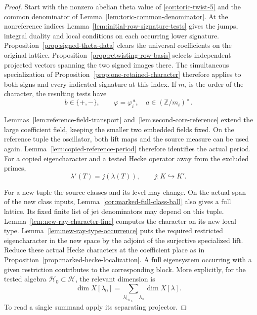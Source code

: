\begin{proof}
Start with the nonzero abelian theta value of \ref{cor:toric-twist-5} and the common denominator of Lemma~\ref{lem:toric-common-denominator}. At the nonreference indices Lemma~\ref{lem:initial-row-signature-tests} gives the jumps, integral duality and local conditions on each occurring lower signature. Proposition~\ref{prop:signed-theta-data} clears the universal coefficients on the original lattice. Proposition~\ref{prop:retwisting-row-basis} selects independent projected vectors spanning the two signed images there. The simultaneous specialization of Proposition~\ref{prop:one-retained-character} therefore applies to both signs and every indicated signature at this index. If \(m_i\) is the order of the character, the resulting tests have
\[
          b\in\{+,-\},\qquad \varphi=\varphi_i^{\,a},
                                     \quad a\in(\mathbb Z/m_i)^\times .
\]

 Lemmas~\ref{lem:reference-field-transport}
and~\ref{lem:second-core-reference} extend the large coefficient
field, keeping the smaller two embedded fields fixed. On the
reference tuple the oscillator, both lift maps and the source
measure can be used again. Lemma~\ref{lem:copied-reference-period}
therefore identifies the actual period. For a copied eigencharacter
and a tested Hecke operator away from the excluded primes,
\[
              \lambda'(T)=j(\lambda(T)),\qquad j:K\hookrightarrow K'.
\]

For a new tuple the source classes and its level may change.
On the actual span of the new class inputs, Lemma~\ref{cor:marked-full-class-ball} also gives a full lattice. Its fixed finite list of jet denominators may depend on this tuple. Lemma~\ref{lem:new-ray-character-line} computes the character on
its new local type. Lemma~\ref{lem:new-ray-type-occurrence} puts the
required restricted eigencharacter in the new space by the
adjoint of the surjective specialized lift. Reduce these actual
Hecke characters at the coefficient place as in
Proposition~\ref{prop:marked-hecke-localization}. A full eigensystem
occurring with a given restriction contributes to the corresponding
block. More explicitly, for the tested algebra \(\mathcal H_0\subset\mathcal H\), the relevant dimension is
\[
       \dim X[\lambda_0]=
           \sum_{\lambda|_{\mathcal H_0}=\lambda_0}\dim X[\lambda].
\]
To read a single summand apply its separating projector.


\end{proof}
